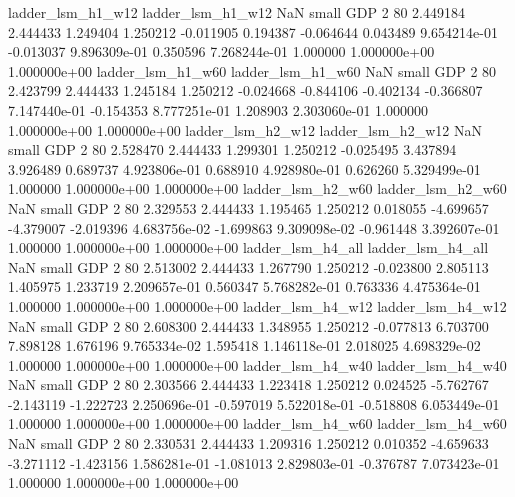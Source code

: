        ladder_lsm_h1_w12        ladder_lsm_h1_w12                   NaN      small      GDP                 2 80 2.449184       2.444433 1.249404       1.250212   -0.011905      0.194387     -0.064644     0.043489   9.654214e-01 -0.013037 9.896309e-01     0.350596   7.268244e-01            1.000000    1.000000e+00        1.000000e+00
       ladder_lsm_h1_w60        ladder_lsm_h1_w60                   NaN      small      GDP                 2 80 2.423799       2.444433 1.245184       1.250212   -0.024668     -0.844106     -0.402134    -0.366807   7.147440e-01 -0.154353 8.777251e-01     1.208903   2.303060e-01            1.000000    1.000000e+00        1.000000e+00
       ladder_lsm_h2_w12        ladder_lsm_h2_w12                   NaN      small      GDP                 2 80 2.528470       2.444433 1.299301       1.250212   -0.025495      3.437894      3.926489     0.689737   4.923806e-01  0.688910 4.928980e-01     0.626260   5.329499e-01            1.000000    1.000000e+00        1.000000e+00
       ladder_lsm_h2_w60        ladder_lsm_h2_w60                   NaN      small      GDP                 2 80 2.329553       2.444433 1.195465       1.250212    0.018055     -4.699657     -4.379007    -2.019396   4.683756e-02 -1.699863 9.309098e-02    -0.961448   3.392607e-01            1.000000    1.000000e+00        1.000000e+00
       ladder_lsm_h4_all        ladder_lsm_h4_all                   NaN      small      GDP                 2 80 2.513002       2.444433 1.267790       1.250212   -0.023800      2.805113      1.405975     1.233719   2.209657e-01  0.560347 5.768282e-01     0.763336   4.475364e-01            1.000000    1.000000e+00        1.000000e+00
       ladder_lsm_h4_w12        ladder_lsm_h4_w12                   NaN      small      GDP                 2 80 2.608300       2.444433 1.348955       1.250212   -0.077813      6.703700      7.898128     1.676196   9.765334e-02  1.595418 1.146118e-01     2.018025   4.698329e-02            1.000000    1.000000e+00        1.000000e+00
       ladder_lsm_h4_w40        ladder_lsm_h4_w40                   NaN      small      GDP                 2 80 2.303566       2.444433 1.223418       1.250212    0.024525     -5.762767     -2.143119    -1.222723   2.250696e-01 -0.597019 5.522018e-01    -0.518808   6.053449e-01            1.000000    1.000000e+00        1.000000e+00
       ladder_lsm_h4_w60        ladder_lsm_h4_w60                   NaN      small      GDP                 2 80 2.330531       2.444433 1.209316       1.250212    0.010352     -4.659633     -3.271112    -1.423156   1.586281e-01 -1.081013 2.829803e-01    -0.376787   7.073423e-01            1.000000    1.000000e+00        1.000000e+00
